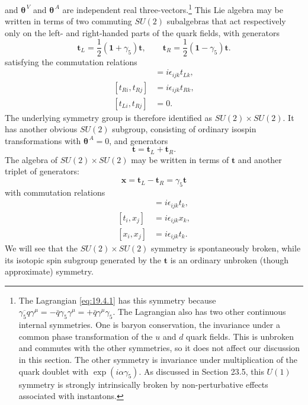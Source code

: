 and $\boldsymbol{\theta}^{\,V}$ and $\boldsymbol{\theta}^{\,A}$ are independent real three-vectors.\footnote{The Lagrangian \eqref{eq:19.4.1} has this symmetry because $\overline{\gamma_5q}\gamma^\mu=-\bar q\gamma_5\gamma^\mu=+\bar q\gamma^\mu\gamma_5$. The Lagrangian also has two other continuous internal symmetries. One is baryon conservation, the invariance under a common phase transformation of the $u$ and $d$ quark fields. This is unbroken and commutes with the other symmetries, so it does not affect our discussion in this section. The other symmetry is invariance under multiplication of the quark doublet with $\exp(i\alpha\gamma_5)$. As discussed in Section 23.5, this $U(1)$ symmetry is strongly intrinsically broken by non-perturbative effects associated with instantons.} This Lie algebra may be written in terms of two commuting $SU(2)$ subalgebras that act respectively only on the left- and right-handed parts of the quark fields, with generators
\begin{equation}
\mathbf{t}_L=\frac12(\mathbf{1}+\gamma_5)\mathbf{t},
\qquad
\mathbf{t}_R=\frac12(\mathbf{1}-\gamma_5)\mathbf{t}.
\tag{19.4.3}\label{eq:19.4.3}
\end{equation}
satisfying the commutation relations
\begin{align}
[t_{Li},t_{Lj}]&=i\epsilon_{ijk}t_{Lk},
\tag{19.4.4}\label{eq:19.4.4}\\
[t_{Ri},t_{Rj}]&=i\epsilon_{ijk}t_{Rk},
\tag{19.4.5}\label{eq:19.4.5}\\
[t_{Li},t_{Rj}]&=0.
\tag{19.4.6}\label{eq:19.4.6}
\end{align}
The underlying symmetry group is therefore identified as $SU(2)\times SU(2)$. It has another obvious $SU(2)$ subgroup, consisting of ordinary isospin transformations with $\boldsymbol{\theta}^{\,A}=0$, and generators
\begin{equation}
\mathbf{t}=\mathbf{t}_L+\mathbf{t}_R.
\tag{19.4.7}\label{eq:19.4.7}
\end{equation}
The algebra of $SU(2)\times SU(2)$ may be written in terms of $\mathbf{t}$ and another triplet of generators:
\begin{equation}
\mathbf{x}=\mathbf{t}_L-\mathbf{t}_R=\gamma_5\mathbf{t}
\tag{19.4.8}\label{eq:19.4.8}
\end{equation}
with commutation relations
\begin{align}
[t_i,t_j]&=i\epsilon_{ijk}t_k,
\tag{19.4.9}\label{eq:19.4.9}\\
[t_i,x_j]&=i\epsilon_{ijk}x_k,
\tag{19.4.10}\label{eq:19.4.10}\\
[x_i,x_j]&=i\epsilon_{ijk}t_k.
\tag{19.4.11}\label{eq:19.4.11}
\end{align}
We will see that the $SU(2)\times SU(2)$ symmetry is spontaneously broken, while its isotopic spin subgroup generated by the $\mathbf{t}$ is an ordinary unbroken (though approximate) symmetry.

